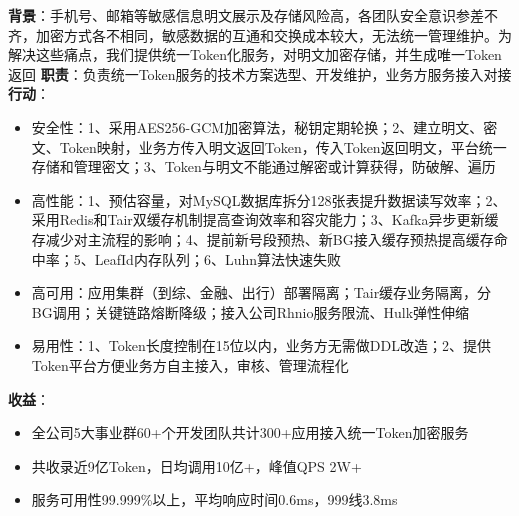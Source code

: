 \documentclass{resume}
\begin{document}
    \begin{onehalfspacing}
        \textbf{背景}：手机号、邮箱等敏感信息明文展示及存储风险高，各团队安全意识参差不齐，加密方式各不相同，敏感数据的互通和交换成本较大，无法统一管理维护。为解决这些痛点，我们提供统一Token化服务，对明文加密存储，并生成唯一Token返回\newline
        \textbf{职责}：负责统一Token服务的技术方案选型、开发维护，业务方服务接入对接\newline
        \textbf{行动}：
        \begin{itemize}
            \item 安全性：1、采用AES256-GCM加密算法，秘钥定期轮换；2、建立明文、密文、Token映射，业务方传入明文返回Token，传入Token返回明文，平台统一存储和管理密文；3、Token与明文不能通过解密或计算获得，防破解、遍历
            \item 高性能：1、预估容量，对MySQL数据库拆分128张表提升数据读写效率；2、采用Redis和Tair双缓存机制提高查询效率和容灾能力；3、Kafka异步更新缓存减少对主流程的影响；4、提前新号段预热、新BG接入缓存预热提高缓存命中率；5、LeafId内存队列；6、Luhn算法快速失败
            \item 高可用：应用集群（到综、金融、出行）部署隔离；Tair缓存业务隔离，分BG调用；关键链路熔断降级；接入公司Rhnio服务限流、Hulk弹性伸缩
            \item 易用性：1、Token长度控制在15位以内，业务方无需做DDL改造；2、提供Token平台方便业务方自主接入，审核、管理流程化
        \end{itemize}
        \textbf{收益}：
        \begin{itemize}
            \item 全公司5大事业群60+个开发团队共计300+应用接入统一Token加密服务
            \item 共收录近9亿Token，日均调用10亿+，峰值QPS 2W+
            \item 服务可用性99.999\%以上，平均响应时间0.6ms，999线3.8ms
        \end{itemize}
    \end{onehalfspacing}
    \blankline{ }
\end{document}
